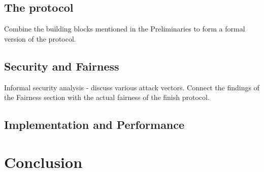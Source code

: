 \documentclass{cacthesis}
\begin{document}
        \section{The protocol}
        Combine the building blocks mentioned in the Preliminaries to form a formal version of the protocol.
        
        \section{Security and Fairness}
	    Informal security analysis - discuss various attack vectors. Connect the findings of the Fairness section with the actual fairness of the finish protocol.
	    
	    \section{Implementation and Performance}
	    
	    
	\chapter{Conclusion}
    
	
	\newpage
    
    
	
	\appendix
\end{document}
